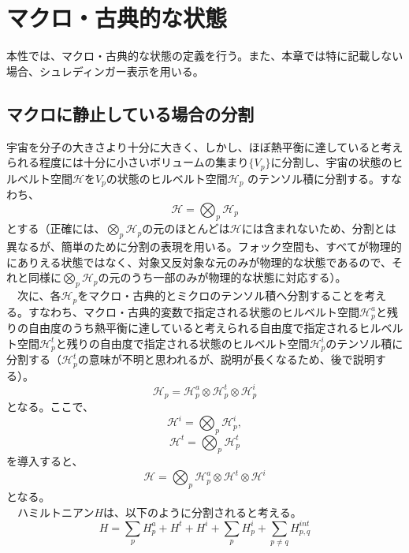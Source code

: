 \section{マクロ・古典的な状態}
本性では、マクロ・古典的な状態の定義を行う。また、本章では特に記載しない場合、シュレディンガー表示を用いる。
\subsection{マクロに静止している場合の分割}
宇宙を分子の大きさより十分に大きく、しかし、ほぼ熱平衡に達していると考えられる程度には十分に小さいボリュームの集まり$\{V_p\}$に分割し、宇宙の状態のヒルベルト空間$\mathcal{H}$を$V_p$の状態のヒルベルト空間$\mathcal{H}_p$ のテンソル積に分割する。すなわち、
\begin{equation}
    \mathcal{H} = \bigotimes_p \mathcal{H}_p
\end{equation}
とする（正確には、$\bigotimes_p \mathcal{H}_p$の元のほとんどは$\mathcal{H}$には含まれないため、分割とは異なるが、簡単のために分割の表現を用いる。フォック空間も、すべてが物理的にありえる状態ではなく、対象又反対象な元のみが物理的な状態であるので、それと同様に$\bigotimes_p \mathcal{H}_p$の元のうち一部のみが物理的な状態に対応する）。\\
　次に、各$\mathcal{H}_p$をマクロ・古典的とミクロのテンソル積へ分割することを考える。すなわち、マクロ・古典的変数で指定される状態のヒルベルト空間$\mathcal{H}_p^a$と残りの自由度のうち熱平衡に達していると考えられる自由度で指定されるヒルベルト空間$\mathcal{H}_p^t$と残りの自由度で指定される状態のヒルベルト空間$\mathcal{H}_p^i$のテンソル積に分割する（$\mathcal{H}_p^t$の意味が不明と思われるが、説明が長くなるため、後で説明する）。
\begin{equation}
    \mathcal{H}_p = \mathcal{H}_p^a \otimes \mathcal{H}_p^t \otimes \mathcal{H}_p^i
\end{equation}
となる。ここで、
\begin{equation}
    \mathcal{H}^i = \bigotimes_p \mathcal{H}_p^i,
\end{equation}
\begin{equation}
    \mathcal{H}^t = \bigotimes_p \mathcal{H}_p^t
\end{equation}
を導入すると、
\begin{equation}
    \mathcal{H} = \bigotimes_p \mathcal{H}_p^a \otimes  \mathcal{H}^t \otimes  \mathcal{H}^i
\end{equation}
となる。\\
　ハミルトニアン$H$は、以下のように分割されると考える。
\begin{equation}
H=\sum_pH_p^a + H^t + H^i + \sum_p H_p^i + \sum_{p \neq q} H^{int}_{p,q}
\end{equation}
